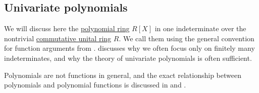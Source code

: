 \subsection{Univariate polynomials}\label{subsec:univariate_polynomials}

We will discuss here the \hyperref[def:polynomial_algebra]{polynomial ring} \( R[X] \) in one indeterminate over the nontrivial \hyperref[def:ring/commutative]{commutative unital ring} \( R \). We call them  using the general convention for function arguments from .  discusses why we often focus only on finitely many indeterminates, and why the theory of univariate polynomials is often sufficient.

Polynomials are not functions in general, and the exact relationship between polynomials and polynomial functions is discussed in  and .

